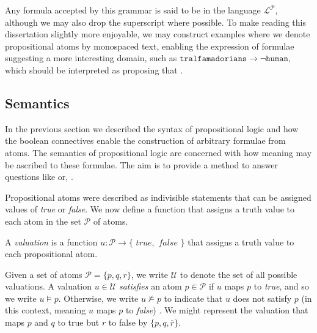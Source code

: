 Any formula accepted by this grammar is said to be in the language $\mathcal{L}^{\mathcal{P}}$, although we may also drop
the superscript where possible. To make reading this dissertation slightly more enjoyable, we may construct examples where
we denote propositional atoms by monospaced text, enabling the expression of formulae suggesting a more interesting
domain, such as $\texttt{tralfamadorians}\rightarrow \neg \texttt{human}$, which should be interpreted as proposing that
 \cite{vonnegut1969slaughterhouse}.

\subsection{Semantics}
\label{subsection:semantics}  In the previous section we described the syntax of propositional
logic and how the boolean connectives enable the construction of arbitrary formulae from atoms. The semantics of
propositional logic are concerned with how meaning may be ascribed to these formulae. The aim is to provide a method to answer
questions like  or, .

Propositional atoms were described as indivisible statements that can be assigned values of \textit{true} or \textit{false}.
We now define a function that assigns a truth value to each atom in the set $\mathcal{P}$ of atoms. 

\begin{definition}
	\label{definition:valuation}  A \textit{valuation} is a function
	$u : \mathcal{P}\to \{\textit{ true}, \textit{ false }\}$ that assigns a truth value to each propositional atom.
\end{definition}

Given a set of atoms $\mathcal{P}= \{p,q,r\}$, we write $\mathcal{U}$ to denote the set of all possible valuations. A
valuation $u \in \mathcal{U}$ \textit{satisfies} an atom $p \in \mathcal{P}$ if $u$ maps $p$ to \textit{true}, and so we
write $u \vDash p$. Otherwise, we write $u \nvDash p$ to indicate that $u$ does not satisfy $p$ (in this context, meaning
$u$ maps $p$ to \textit{false}) \cite{Ben1993Mathematical}. We might represent the valuation that maps $p$ and $q$ to
true but $r$ to false by $\{p,q,\overline{r}\}$.

